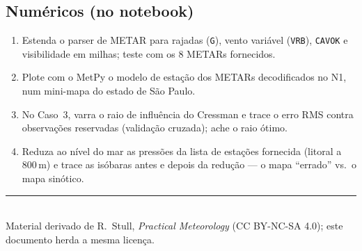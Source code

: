 \documentclass[11pt]{article}
\begin{document}
\subsection*{Numéricos (no notebook)}

\begin{enumerate}[label=\textbf{N\arabic*.},itemsep=4pt]
  \item Estenda o parser de METAR para rajadas (\texttt{G}), vento
        variável (\texttt{VRB}), \texttt{CAVOK} e visibilidade em
        milhas; teste com os 8 METARs fornecidos.
  \item Plote com o MetPy o modelo de estação dos METARs decodificados
        no N1, num mini-mapa do estado de São Paulo.
  \item No Caso~3, varra o raio de influência do Cressman e trace o
        erro RMS contra observações reservadas (validação cruzada);
        ache o raio ótimo.
  \item Reduza ao nível do mar as pressões da lista de estações
        fornecida (litoral a 800\,m) e trace as isóbaras antes e depois
        da redução — o mapa ``errado'' vs.\ o mapa sinótico.
\end{enumerate}

\vspace{1em}
\noindent\rule{\linewidth}{0.4pt}\\
{\scriptsize Material derivado de R.~Stull, \emph{Practical Meteorology}
(CC BY-NC-SA 4.0); este documento herda a mesma licença.}
\end{document}
